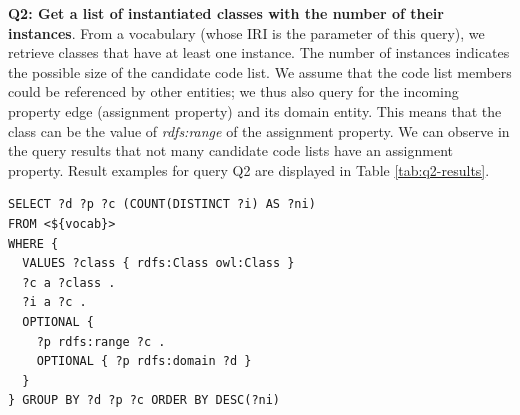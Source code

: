 \medskip
\noindent\textbf{Q2: Get a list of instantiated classes with the number of their instances}. From a vocabulary (whose IRI is the parameter of this query), we retrieve classes that have at least one instance. The number of instances indicates the possible size of the candidate code list. We assume that the code list members could be referenced by other entities; we thus also query for the incoming property edge (assignment property) and its domain entity. This means that the class can be the value of \textit{rdfs:range} of the assignment property. We can observe in the query results that not many candidate code lists have an assignment property. %
Result examples for query Q2 are displayed in Table \ref{tab:q2-results}.

\begin{lstlisting}[captionpos=b, caption=Q2 -- Query to get the number of instances of each class in an ontology with their range properties and domain classes,label=lst:sparql2,basicstyle=\small\ttfamily,frame=single]
SELECT ?d ?p ?c (COUNT(DISTINCT ?i) AS ?ni)
FROM <${vocab}>
WHERE {
  VALUES ?class { rdfs:Class owl:Class }
  ?c a ?class .
  ?i a ?c .
  OPTIONAL { 
    ?p rdfs:range ?c . 
    OPTIONAL { ?p rdfs:domain ?d }
  }
} GROUP BY ?d ?p ?c ORDER BY DESC(?ni)
\end{lstlisting}

